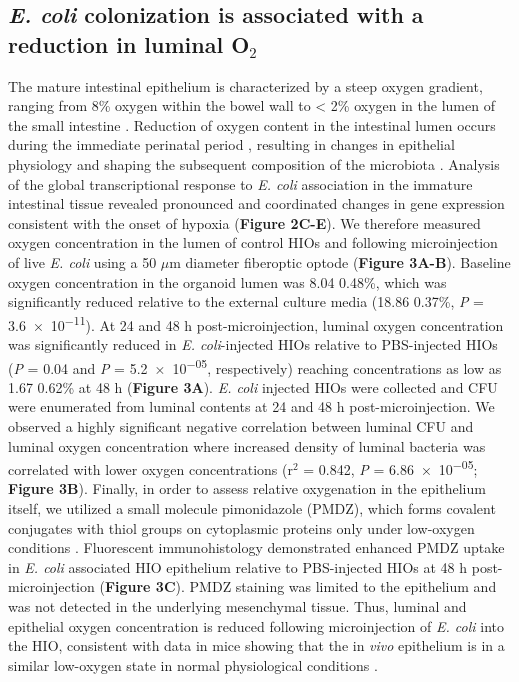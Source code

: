 \documentclass[9pt,lineo]{elife}
\begin{document}
\subsection*{{\bfseries\sffamily } \emph{E. coli} colonization is associated with a reduction in luminal O\(_{\text{2}}\)}
\label{sec:orgheadline5}
The mature intestinal epithelium is characterized by a steep oxygen gradient, ranging from 8\% oxygen within the bowel wall to < 2\% oxygen in the lumen of the small intestine \citep{Fisher:2013}. Reduction of oxygen content in the intestinal lumen occurs during the immediate perinatal period \citep{Gruette:1965}, resulting in changes in epithelial physiology \citep{Glover:2016,Kelly:2015,Colgan:2013,Zeitouni:2016} and shaping the subsequent composition of the microbiota \citep{Schmidt:2014,Espey:2013,Albenberg:2014,Palmer:2007,Koenig:2011}. Analysis of the global transcriptional response to \emph{E. coli} association in the immature intestinal tissue revealed pronounced and coordinated changes in gene expression consistent with the onset of hypoxia (\textbf{Figure 2C-E}). We therefore measured oxygen concentration in the lumen of control HIOs and following microinjection of live \emph{E. coli} using a 50 \(\mu\)m diameter fiberoptic optode (\textbf{Figure 3A-B}). Baseline oxygen concentration in the organoid lumen was 8.04 \textpm{} 0.48\%, which was significantly reduced relative to the external culture media (18.86 \textpm{} 0.37\%, \emph{P} = \num{3.6e-11}). At 24 and 48 h post-microinjection, luminal oxygen concentration was significantly reduced in \emph{E. coli}-injected HIOs relative to PBS-injected HIOs (\emph{P} = \num{0.04} and \emph{P} = \num{5.2e-05}, respectively) reaching concentrations as low as 1.67 \textpm{} 0.62\% at 48 h (\textbf{Figure 3A}). \emph{E. coli} injected HIOs were collected and CFU were enumerated from luminal contents at 24 and 48 h post-microinjection. We observed a highly significant negative correlation between luminal CFU and luminal oxygen concentration where increased density of luminal bacteria was correlated with lower oxygen concentrations (r\(^{\text{2}}\) = 0.842, \emph{P} = \num{6.86e-05}; \textbf{Figure 3B}). Finally, in order to assess relative oxygenation in the epithelium itself, we utilized a small molecule pimonidazole (PMDZ), which forms covalent conjugates with thiol groups on cytoplasmic proteins only under low-oxygen conditions \citep{Arteel:1998}. Fluorescent immunohistology demonstrated enhanced PMDZ uptake in \emph{E. coli} associated HIO epithelium relative to PBS-injected HIOs at 48 h post-microinjection (\textbf{Figure 3C}). PMDZ staining was limited to the epithelium and was not detected in the underlying mesenchymal tissue. Thus, luminal and epithelial oxygen concentration is reduced following microinjection of \emph{E. coli} into the HIO, consistent with data in mice showing that the in \emph{vivo} epithelium is in a similar low-oxygen state in normal physiological conditions \citep{Schmidt:2014,Kelly:2015,Kim:2017}.
\end{document}
